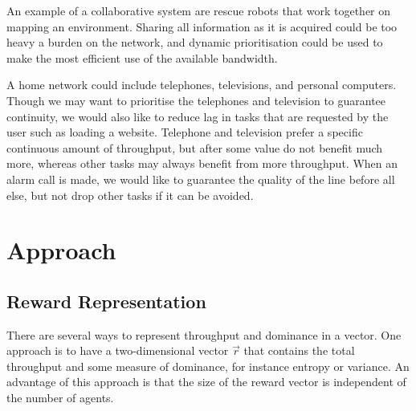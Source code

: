 \documentclass{article}
\begin{document}
\begin{multicols}{2}
	An example of a collaborative system are rescue robots that work together on
	mapping an environment. Sharing all information as it is acquired could be
	too heavy a burden on the network, and dynamic prioritisation could be used
	to make the most efficient use of the available bandwidth.

	A home network could include telephones, televisions, and personal
	computers. Though we may want to prioritise the telephones and television to
	guarantee continuity, we would also like to reduce lag in tasks that are
	requested by the user such as loading a website. Telephone and television
	prefer a specific continuous amount of throughput, but after some value do
	not benefit much more, whereas other tasks may always benefit from more
	throughput. When an alarm call is made, we would like to guarantee the
	quality of the line before all else, but not drop other tasks if it can be
	avoided.

	\section{Approach}
	\label{sec:approach}

		\subsection{Reward Representation}
		\label{sub:reward_representation}
		There are several ways to represent throughput and dominance in a vector.
		One approach is to have a two-dimensional vector $\vec{r}$ that contains
		the total throughput and some measure of dominance, for instance entropy
		or variance. An advantage of this approach is that the size of the reward
		vector is independent of the number of agents.


\end{multicols}
\end{document}
